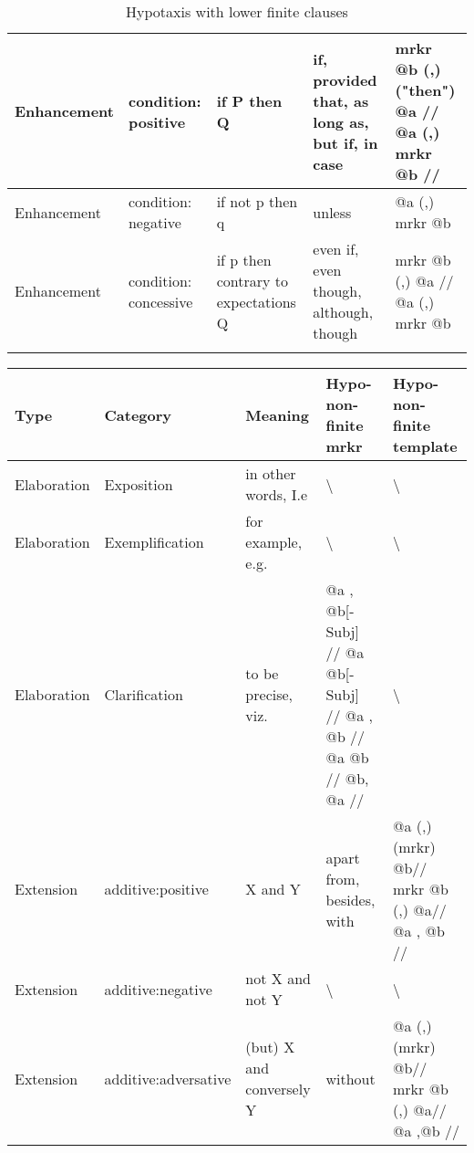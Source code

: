 \begin{landscape}
\begin{longtable}{|l|l|p{3cm}|p{5cm}|p{5cm}|}
			Enhancement & condition: positive    & if P then Q                          & if, provided that, as long as, but if, in case                                & mrkr @b (,) ("then") @a // @a (,) mrkr @b // \\ \hline
			Enhancement & condition: negative    & if not p then q                      & unless                                                                        & @a (,) mrkr @b                               \\ \hline
			Enhancement & condition: concessive  & if p then contrary to expectations Q & even if, even though, although, though                                        & mrkr @b (,) @a // @a (,) mrkr @b             \\ \hline
			\caption{Hypotaxis with lower finite clauses}
			\label{tab:hytpotaxis-finite}
		\end{longtable}
		\begin{longtable}{|l|l|p{3cm}|p{5cm}|p{5cm}|}
			\hline
			{\bf Type}  & {\bf Category}         & {\bf Meaning}                        & {\bf Hypo-non-finite mrkr}                                              & {\bf Hypo-non-finite template}                 \\ \hline
			Elaboration & Exposition             & in other words, I.e                  & \textbackslash                                                          & \textbackslash                                 \\ \hline
			Elaboration & Exemplification        & for example, e.g.                    & \textbackslash                                                          & \textbackslash                                 \\ \hline
			Elaboration & Clarification          & to be precise, viz.                  & @a , @b{[}-Subj{]} // @a @b{[}-Subj{]} // @a , @b // @a @b // @b, @a // & \textbackslash                                 \\ \hline
			Extension   & additive:positive      & X and Y                              & apart from, besides, with                                               & @a (,) (mrkr) @b// mrkr @b (,) @a// @a , @b // \\ \hline
			Extension   & additive:negative      & not X and not Y                      & \textbackslash                                                          & \textbackslash                                 \\ \hline
			Extension   & additive:adversative   & (but) X and conversely Y             & without                                                                 & @a (,) (mrkr) @b// mrkr @b (,) @a// @a ,@b //  \\ \hline

\end{longtable}
\end{landscape}
